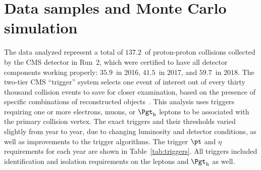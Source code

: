 \section{Data samples and Monte Carlo simulation}
\label{sec:datasets}

The data analyzed represent a total of $137.2$~\fbinv of proton-proton collisions
collected by the CMS detector in Run~2, which were certified to have all detector components
working properly: $35.9$~\fbinv in 2016, $41.5$~\fbinv in 2017, and $59.7$~\fbinv in 2018.
The two-tier CMS ``trigger'' system selects one event of interest out of every thirty
thousand collision events to save for closer examination, based on the presence of
specific combinations of reconstructed objects~\cite{Khachatryan:2016bia,Sirunyan:2020zal}.  This analysis
uses triggers requiring one or more electrons, muons, or $\tauh$
leptons to be associated with the primary collision vertex. The exact triggers and their
thresholds varied slightly from year to year, due to changing luminosity and detector
conditions, as well as improvements to the trigger algorithms.  The trigger $\pt$ and
$\eta$ requirements for each year are shown in Table~\ref{tab:triggers}.  All
triggers included identification and isolation requirements on the leptons and $\tauh$ as well.

